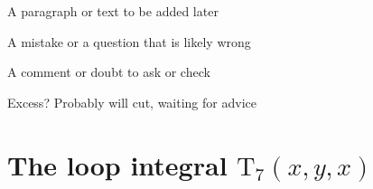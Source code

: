 \documentclass[12pt]{report}
\newcommand{\ro}[1]{\textrm{#1}}
\renewcommand{\(}{\left(}
\renewcommand{\)}{\right)}
\renewcommand{\[}{\left[}
\renewcommand{\]}{\right]}
\begin{document}
{{\color{green}A paragraph or text to be added later  }

{{\color{red}   A mistake or a question that is likely wrong }

{{\color{blue}  A comment or doubt to ask or check}

{{\color{gray} Excess? Probably will cut, waiting for advice} 













\section{The loop integral $\ro{T}_7(x,y,x)$}
\label{app:T7}

}}}}
\end{document}
